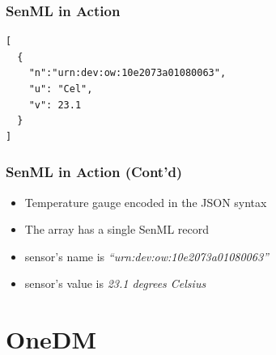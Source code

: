 \documentclass{../iot-lecture}
\begin{document}
\begin{frame}[fragile]
  \frametitle{SenML in Action}
  \begin{verbatim}
[
  {
    "n":"urn:dev:ow:10e2073a01080063",
    "u": "Cel",
    "v": 23.1
  }
]
  \end{verbatim}
\end{frame}

\begin{frame}
  \frametitle{SenML in Action (Cont'd)}
  \begin{itemize}
    \item Temperature gauge encoded in the JSON syntax
    \item The array has a single SenML record
    \item sensor's name is \textit{``urn:dev:ow:10e2073a01080063''}
    \item sensor's value is \textit{23.1 degrees Celsius}
  \end{itemize}
\end{frame}

\section{OneDM}

\end{document}
